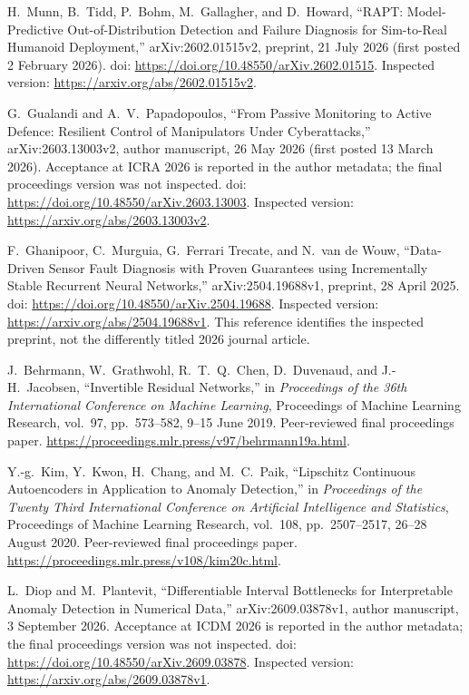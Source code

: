 
H.~Munn, B.~Tidd, P.~Bohm, M.~Gallagher, and D.~Howard,
``RAPT: Model-Predictive Out-of-Distribution Detection and Failure Diagnosis for Sim-to-Real Humanoid Deployment,''
arXiv:2602.01515v2, preprint, 21 July 2026 (first posted 2 February 2026).
doi: \url{https://doi.org/10.48550/arXiv.2602.01515}.
Inspected version: \url{https://arxiv.org/abs/2602.01515v2}.

G.~Gualandi and A.~V.~Papadopoulos,
``From Passive Monitoring to Active Defence: Resilient Control of Manipulators Under Cyberattacks,''
arXiv:2603.13003v2, author manuscript, 26 May 2026 (first posted 13 March 2026).
Acceptance at ICRA 2026 is reported in the author metadata; the final proceedings version was not inspected.
doi: \url{https://doi.org/10.48550/arXiv.2603.13003}.
Inspected version: \url{https://arxiv.org/abs/2603.13003v2}.

F.~Ghanipoor, C.~Murguia, G.~Ferrari Trecate, and N.~van de Wouw,
``Data-Driven Sensor Fault Diagnosis with Proven Guarantees using Incrementally Stable Recurrent Neural Networks,''
arXiv:2504.19688v1, preprint, 28 April 2025.
doi: \url{https://doi.org/10.48550/arXiv.2504.19688}.
Inspected version: \url{https://arxiv.org/abs/2504.19688v1}.
This reference identifies the inspected preprint, not the differently titled 2026 journal article.

J.~Behrmann, W.~Grathwohl, R.~T.~Q.~Chen, D.~Duvenaud, and J.-H.~Jacobsen,
``Invertible Residual Networks,''
in \emph{Proceedings of the 36th International Conference on Machine Learning},
Proceedings of Machine Learning Research, vol.~97, pp.~573--582, 9--15 June 2019.
Peer-reviewed final proceedings paper.
\url{https://proceedings.mlr.press/v97/behrmann19a.html}.

Y.-g.~Kim, Y.~Kwon, H.~Chang, and M.~C.~Paik,
``Lipschitz Continuous Autoencoders in Application to Anomaly Detection,''
in \emph{Proceedings of the Twenty Third International Conference on Artificial Intelligence and Statistics},
Proceedings of Machine Learning Research, vol.~108, pp.~2507--2517, 26--28 August 2020.
Peer-reviewed final proceedings paper.
\url{https://proceedings.mlr.press/v108/kim20c.html}.

L.~Diop and M.~Plantevit,
``Differentiable Interval Bottlenecks for Interpretable Anomaly Detection in Numerical Data,''
arXiv:2609.03878v1, author manuscript, 3 September 2026.
Acceptance at ICDM 2026 is reported in the author metadata; the final proceedings version was not inspected.
doi: \url{https://doi.org/10.48550/arXiv.2609.03878}.
Inspected version: \url{https://arxiv.org/abs/2609.03878v1}.

